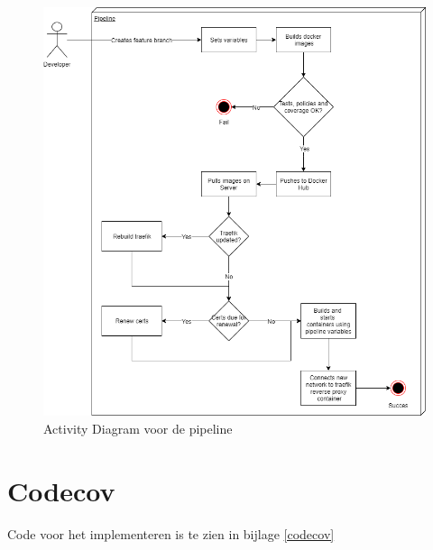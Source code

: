 \begin{figure}[h]
	\centering
	\includegraphics[width=13cm]{Figures/Activitydiagram}
	\decoRule
	\caption[ActivityDiagram]{Activity Diagram voor de pipeline}
	\label{fig:infra}
\end{figure}

\section{Codecov}
Code voor het implementeren is te zien in bijlage \ref{codecov}
